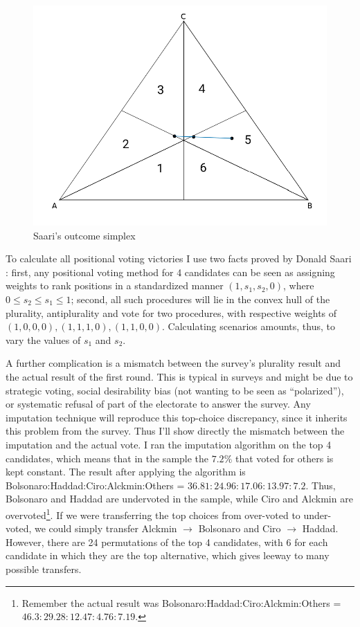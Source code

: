 \documentclass[hidelinks,11pt]{article}
\begin{document}
\begin{figure}[H]
 \centering
 \includegraphics[width=0.8\columnwidth,
 height=0.3\textheight]{./images/simpletriangle.png}
 \caption{Saari's outcome simplex}
 \label{fig:saari_nurmi}
\end{figure}

To calculate all positional voting victories I use two facts proved by Donald
Saari \parencite{saari2012geometry, saari2001chaotic}: first, any positional
voting method for 4 candidates can be seen as assigning weights to rank
positions in a standardized manner \((1,s_{1},s_{2},0)\), where
\(0 \leq s_{2} \leq s_{1} \leq 1\); second, all such procedures will lie in the
convex hull of the plurality, antiplurality and vote for two procedures, with
respective weights of \((1,0,0,0), (1,1,1,0), (1,1,0,0)\). Calculating scenarios
amounts, thus, to vary the values of \(s_{1}\) and \(s_{2}\).

A further complication is a mismatch between the survey's plurality result and
the actual result of the first round. This is typical in surveys and might be
due to strategic voting, social desirability bias (not wanting to be seen as
``polarized''), or systematic refusal of part of the electorate to answer the
survey. Any imputation technique will reproduce this top-choice discrepancy,
since it inherits this problem from the survey. Thus I'll show directly the
mismatch between the imputation and the actual vote. I ran the imputation
algorithm on the top 4 candidates, which means that in the sample the \(7.2\%\)
that voted for others is kept constant. The result after applying the algorithm
is Bolsonaro:Haddad:Ciro:Alckmin:Others =
\(36.81 : 24.96 : 17.06: 13.97 : 7.2 \). Thus, Bolsonaro and Haddad are
undervoted in the sample, while Ciro and Alckmin are overvoted\footnote{Remember
  the actual result was Bolsonaro:Haddad:Ciro:Alckmin:Others =
  \(46.3 : 29.28 : 12.47 : 4.76 : 7.19 \).}. If we were transferring the top choices
from over-voted to under-voted, we could simply transfer Alckmin \(\rightarrow\)
Bolsonaro and Ciro \(\rightarrow\) Haddad. However, there are 24 permutations of
the top 4 candidates, with 6 for each candidate in which they are the top
alternative, which gives leeway to many possible transfers.
\end{document}
